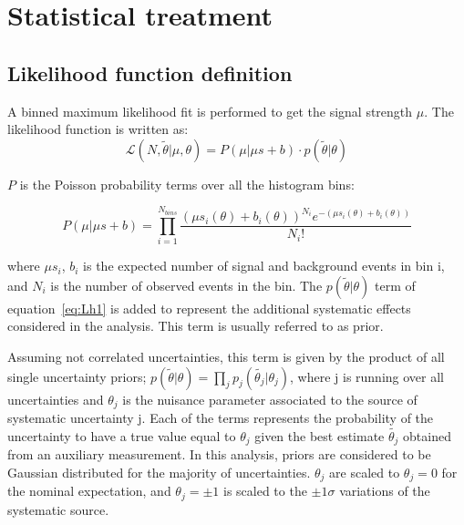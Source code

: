 \chapter{Statistical treatment}

\section{Likelihood function definition}
A binned maximum likelihood fit is performed to get the signal strength $\mu$. The likelihood function is written as:
\begin{equation} \label{eq:Lh1}
\mathcal{L}\left( N, \tilde{\theta} | \mu, \theta \right)=  P\left( \mu | \mu s +b \right) \cdot p\left( \tilde{\theta} | \theta \right)
 \end{equation}
 
 $P$ is the Poisson probability terms over all the histogram bins:

 \begin{equation} \label{eq:Lh2}
 P\left( \mu | \mu s +b \right)  =  \prod_{i=1}^{N_{bins}} \frac{{ (\mu s_{i} (\theta)+ b_{i}(\theta))^{N_{i}} e^{ - (\mu s_{i}(\theta) + b_{i}(\theta))} } }{{N_{i}!}}
 \end{equation}

where $\mu s_{i }$, $b_{i }$ is the expected number of signal and background events in bin i, and $N_{i}$ is the number of observed events in the bin. 
The $p\left( \tilde{\theta} | \theta \right)$ term of equation~\ref{eq:Lh1} is added to represent the additional systematic effects considered in the analysis. This term is usually referred to as prior. 

Assuming not correlated uncertainties, this term is given by the product of all single uncertainty priors; $ p\left( \tilde{\theta} | \theta \right) =  \prod_{j}p_{j}\left( \tilde{\theta_{j}} | \theta_{j} \right)$, where j is running over all uncertainties and  $\theta_{j}$ is the nuisance parameter associated to the source of systematic uncertainty j. Each of the terms represents the probability of the uncertainty to have a true value equal to $\theta_{j}$ given the best estimate $ \tilde{\theta_j}$ obtained from an auxiliary measurement. 
In this analysis, priors are considered to be Gaussian distributed for the majority of uncertainties. $\theta_{j} $ are scaled to $\theta_{j} =0$ for the nominal expectation, and $\theta_{j} = \pm 1$ is scaled to the $\pm 1 \sigma$ variations of the systematic source.




